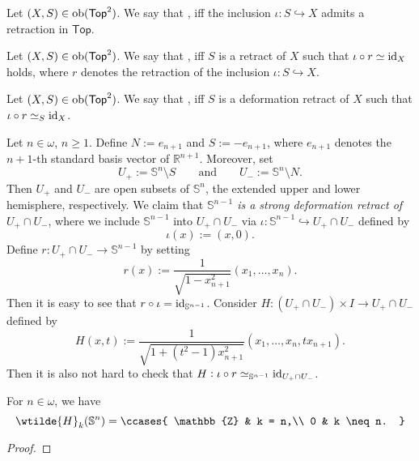 \begin{definition}[Retract]
	Let $(X,S) \in \operatorname{ob}(\mathsf{Top}^2)$. We say that ,  iff the inclusion $\iota : S \hookrightarrow X$ admits a retraction in $\mathsf{Top}$.
\end{definition}

\begin{definition}
	Let $(X,S) \in \operatorname{ob}(\mathsf{Top}^2)$. We say that , iff $S$ is a retract of $X$ such that $\iota \circ r \simeq \operatorname{id}_X$ holds, where $r$ denotes the retraction of the inclusion $\iota : S \hookrightarrow X$.
\end{definition}

\begin{definition}
	Let $(X,S) \in \operatorname{ob}(\mathsf{Top}^2)$. We say that , iff $S$ is a deformation retract of $X$ such that $\iota \circ r \simeq_S \operatorname{id}_X$.
\end{definition}

\begin{example}
	\label{ex:strong_deformation_retract_spheres}
	Let $n \in \omega$, $n \geq 1$. Define $N := e_{n + 1}$ and $S := -e_{n + 1}$, where $e_{n + 1}$ denotes the $n + 1$-th standard basis vector of $\mathbb{R}^{n + 1}$. Moreover, set
	\begin{equation*}
		U_+ := \mathbb{S}^n \setminus S \qquad \text{and} \qquad U_- := \mathbb{S}^n \setminus N.
	\end{equation*}
	Then $U_+$ and $U_-$ are open subsets of $\mathbb{S}^n$, the extended upper and lower hemisphere, respectively. We claim that \emph{$\mathbb{S}^{n - 1}$ is a strong deformation retract of $U_+ \cap U_-$}, where we include $\mathbb{S}^{n - 1}$ into $U_+ \cap U_-$ via $\iota : \mathbb{S}^{n - 1} \hookrightarrow U_+ \cap U_-$ defined by
	\begin{equation*}
		\iota(x) := (x,0).
	\end{equation*}
	Define $r : U_+ \cap U_- \to \mathbb{S}^{n - 1}$ by setting
	\begin{equation*}
		r(x) := \frac{1}{\sqrt{1 - x_{n + 1}^2}} (x_1,\dots,x_n).
	\end{equation*}
	Then it is easy to see that $r \circ \iota = \operatorname{id}_{\mathbb{S}^{n - 1}}$. Consider $H : (U_+ \cap U_-) \times I \to U_+ \cap U_-$ defined by
	\begin{equation*}
		H(x,t) := \frac{1}{\sqrt{1 + (t^2 - 1)x_{n + 1}^2}}(x_1,\dots,x_n,tx_{n + 1}).
	\end{equation*}
	Then it is also not hard to check that $H : \iota \circ r \simeq_{\mathbb{S}^{n - 1}} \operatorname{id}_{U_+ \cap U_-}$. 
\end{example}

\begin{proposition}
	For $n \in \omega$, we have
	\begin{equation*}
		\wtilde{H}_k(\mathbb{S}^n) = \ccases{
			\mathbb{Z} & k = n,\\
			0 & k \neq n.
		}
	\end{equation*} 
\end{proposition}

\begin{proof}
	
\end{proof}
